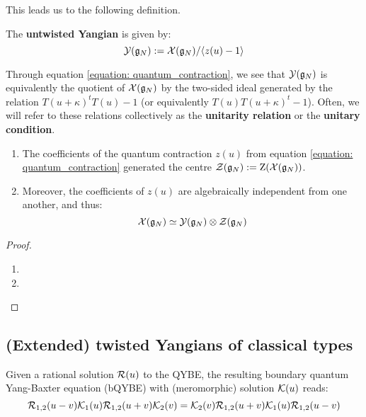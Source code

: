         This leads us to the following definition.
        \begin{definition} \label{def: untwisted_yangians}
            The \textbf{untwisted Yangian} is given by:
                $$\mathcal{Y}(\mathfrak{g}_N) := \mathcal{X}(\mathfrak{g}_N)/\langle z(u) - 1\rangle$$
        \end{definition}
        \begin{remark}[Unitarity]
            Through equation \eqref{equation: quantum_contraction}, we see that $\mathcal{Y}(\mathfrak{g}_N)$ is equivalently the quotient of $\mathcal{X}(\mathfrak{g}_N)$ by the two-sided ideal generated by the relation $T(u + \kappa)^t T(u) - 1$ (or equivalently $T(u) T(u + \kappa)^t - 1$). Often, we will refer to these relations collectively as the \textbf{unitarity relation} or the \textbf{unitary condition}.
        \end{remark}
        \begin{lemma} \label{lemma: centres_of_extended_untwisted_yangians}
            \begin{enumerate}
                \item The coefficients of the quantum contraction $z(u)$ from equation \eqref{equation: quantum_contraction} generated the centre $\mathcal{Z}(\mathfrak{g}_N) := \mathrm{Z}( \mathcal{X}(\mathfrak{g}_N) )$.
                \item Moreover, the coefficients of $z(u)$ are algebraically independent from one another, and thus:
                    $$\calX(\g_N) \cong \calY(\g_N) \tensor \calZ(\g_N)$$
            \end{enumerate}
        \end{lemma}
            \begin{proof}
                \begin{enumerate}
                    \item 
                    \item 
                \end{enumerate}
            \end{proof}

    \subsection{(Extended) twisted Yangians of classical types}
        \begin{definition} \label{def: boundary_quantum_yang_baxter_equations}
            Given a rational solution $\mathcal{R}(u)$ to the QYBE, the resulting boundary quantum Yang-Baxter equation (bQYBE) with (meromorphic) solution $\mathcal{K}(u)$ reads:
                \begin{equation} \label{equation: boundary_quantum_yang_baxter_equations}
                    \mathcal{R}_{1, 2}(u - v) \mathcal{K}_1(u) \mathcal{R}_{1, 2}(u + v) \mathcal{K}_2(v) = \mathcal{K}_2(v) \mathcal{R}_{1, 2}(u + v) \mathcal{K}_1(u) \mathcal{R}_{1, 2}(u - v) 
                \end{equation}
        \end{definition}
    
